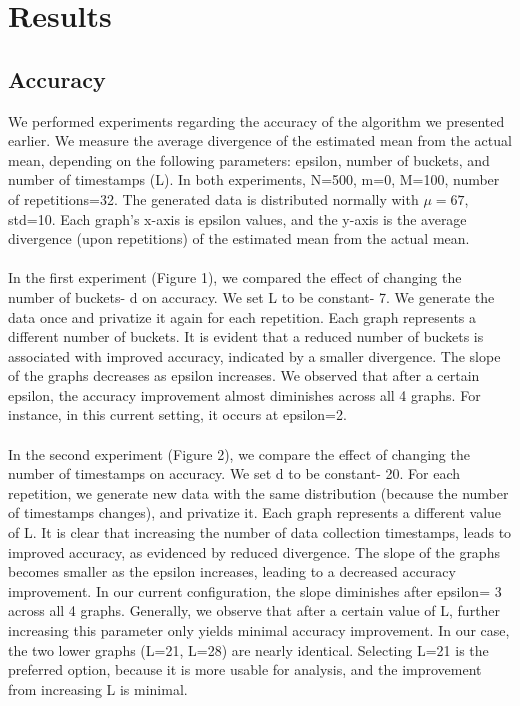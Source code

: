 \documentclass[sigconf]{acmart}
\begin{document}
\section{Results} \subsection{Accuracy} We performed experiments regarding the accuracy of the algorithm we presented earlier. We measure the average divergence of the estimated mean from the actual mean, depending on the following parameters: epsilon, number of buckets, and number of timestamps (L).
In both experiments, N=500, m=0, M=100, number of repetitions=32. The generated data is distributed normally with $\mu=67$, std=10. Each graph's x-axis is epsilon values, and the y-axis is the average divergence (upon repetitions) of the estimated mean from the actual mean.\\ \\
In the first experiment (Figure 1), we compared the effect of changing the number of buckets- d on accuracy. We set L to be constant- 7. We generate the data once and privatize it again for each repetition. Each graph represents a different number of buckets. It is evident that a reduced number of buckets is associated with improved accuracy, indicated by a smaller divergence. The slope of the graphs decreases as epsilon increases. We observed that after a certain epsilon, the accuracy improvement almost diminishes across all 4 graphs. For instance, in this current setting, it occurs at epsilon=2.
\\\\
In the second experiment (Figure 2), we compare the effect of changing the number of timestamps on accuracy. We set d to be constant- 20. For each repetition, we generate new data with the same distribution (because the number of timestamps changes), and privatize it. Each graph represents a different value of L. It is clear that increasing the number of data collection timestamps, leads to improved accuracy, as evidenced by reduced divergence. The slope of the graphs becomes smaller as the epsilon increases, leading to a decreased accuracy improvement.  In our current configuration, the slope diminishes after epsilon= 3 across all 4 graphs. Generally, we observe that after a certain value of L, further increasing this parameter only yields minimal accuracy improvement. In our case, the two lower graphs (L=21, L=28) are nearly identical. Selecting L=21 is the preferred option, because it is more usable for analysis, and the improvement from increasing L is minimal.\\ 
\end{document}
